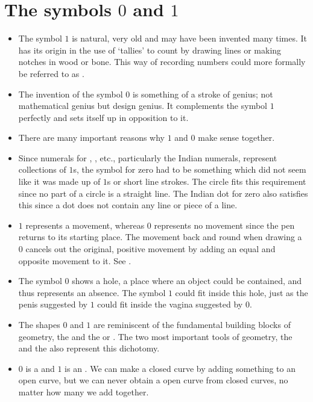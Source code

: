 \chapter{The symbols $0$ and $1$}
\label{01symbols}
\begin{itemize}
\item
The symbol $1$ is natural, very old and may have been invented many times. It has its origin in the use of `tallies' to count by drawing lines or making notches in wood or bone. This way of recording numbers could more formally be referred to as .
\item
The invention of the symbol $0$ is something of a stroke of genius; not mathematical genius but design genius. It complements the symbol $1$ perfectly and sets itself up in opposition to it. 
\item
There are many important reasons why $1$ and $0$ make sense together.
\item
Since numerals for , , etc., particularly the Indian numerals, represent collections of $1$s, the symbol for zero had to be something which did not seem like it was made up of $1$s or short line strokes. The circle fits this requirement since no part of a circle is a straight line. The Indian dot for zero also satisfies this since a dot does not contain any line or piece of a line.
\item 
$1$ represents a movement, whereas $0$ represents no movement since the pen returns to its starting place. The movement back and round when drawing a $0$ cancels out the original, positive movement by adding an equal and opposite movement to it. See . 
\item
The symbol $0$ shows a hole, a place where an object could be contained, and thus represents an absence. The symbol $1$ could fit inside this hole, just as the penis suggested by $1$ could fit inside the vagina suggested by $0$.
\item
The shapes $0$ and $1$ are reminiscent of the fundamental building blocks of geometry, the  and the  or . The two most important tools of geometry, the  and the  also represent this dichotomy.
\item
$0$ is a  and $1$ is an . We can make a closed curve by adding something to an open curve, but we can never obtain a open curve from closed curves, no matter how many we add together.
\end{itemize}
